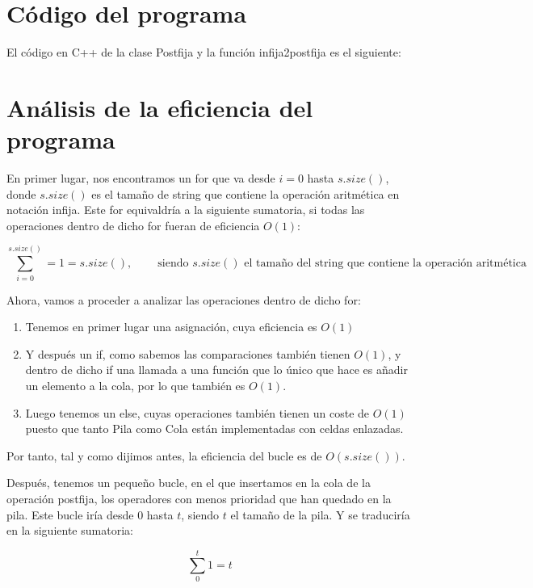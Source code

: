 \documentclass[11pt,a4paper]{article}
\begin{document}
\newpage %
\section{Código del programa}
\noindent
El código en C++ de la clase Postfija y la función infija2postfija es el siguiente: \label{codigo_programa}

\newpage
\section{Análisis de la eficiencia del programa}
\noindent
En primer lugar, nos encontramos un for que va desde $i=0$ hasta $s.size()$, donde $s.size()$ es el tamaño de string que contiene la operación aritmética en notación infija. Este for equivaldría a la siguiente sumatoria, si todas las operaciones dentro de dicho for fueran de eficiencia $O(1)$:

\begin{displaymath}
\sum_{i=0}^{s.size()} = 1 = s.size(), \qquad\ \textrm{siendo $s.size()$ el tamaño del string que contiene la operación aritmética}
\end{displaymath}

\noindent
Ahora, vamos a proceder a analizar las operaciones dentro de dicho for:
\begin{enumerate}[$\heartsuit$]
	\item Tenemos en primer lugar una asignación, cuya eficiencia es $O(1)$
	\item Y después un if, como sabemos las comparaciones también tienen $O(1)$, y dentro de dicho if una llamada a una función que lo único que hace es añadir un elemento a la cola, por lo que también es $O(1)$.
	\item Luego tenemos un else, cuyas operaciones también tienen un coste de $O(1)$ puesto que tanto Pila como Cola están implementadas con celdas enlazadas.
\end{enumerate}

\noindent
Por tanto, tal y como dijimos antes, la eficiencia del bucle es de $O(s.size())$.

\noindent
Después, tenemos un pequeño bucle, en el que insertamos en la cola de la operación postfija, los operadores con menos prioridad que han quedado en la pila. Este bucle iría desde $0$ hasta $t$, siendo $t$ el tamaño de la pila. Y se traduciría en la siguiente sumatoria:

\begin{displaymath}
\sum_0^t 1 = t
\end{displaymath}
\end{document}
